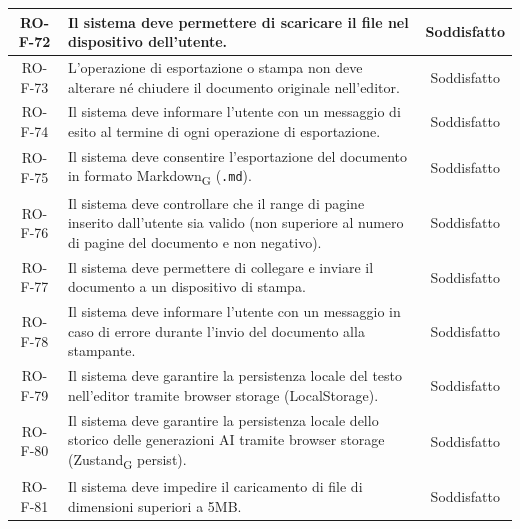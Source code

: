 \documentclass[11pt,a4paper]{article}
\newcommand{\gls}[1]{#1\textsubscript{G}}
\begin{document}
\begin{longtable}{|c|p{11cm}|c|}
\hline
RO-F-72 & Il sistema deve permettere di scaricare il file nel dispositivo dell'utente. & Soddisfatto \\
\hline
RO-F-73 & L'operazione di esportazione o stampa non deve alterare né chiudere il documento originale nell'editor. & Soddisfatto \\
\hline
RO-F-74 & Il sistema deve informare l'utente con un messaggio di esito al termine di ogni operazione di esportazione. & Soddisfatto \\
\hline
RO-F-75 & Il sistema deve consentire l'esportazione del documento in formato \gls{Markdown} (\texttt{.md}). & Soddisfatto \\
\hline
RO-F-76 & Il sistema deve controllare che il range di pagine inserito dall'utente sia valido (non superiore al numero di pagine del documento e non negativo). & Soddisfatto \\
\hline
RO-F-77 & Il sistema deve permettere di collegare e inviare il documento a un dispositivo di stampa. & Soddisfatto \\
\hline
RO-F-78 & Il sistema deve informare l'utente con un messaggio in caso di errore durante l'invio del documento alla stampante. & Soddisfatto \\
\hline
RO-F-79 & Il sistema deve garantire la persistenza locale del testo nell'editor tramite browser storage (LocalStorage). & Soddisfatto \\
\hline
RO-F-80 & Il sistema deve garantire la persistenza locale dello storico delle generazioni AI tramite browser storage (\gls{Zustand} persist). & Soddisfatto \\
\hline
RO-F-81 & Il sistema deve impedire il caricamento di file di dimensioni superiori a 5MB. & Soddisfatto \\
\hline


\end{longtable}
\end{document}
